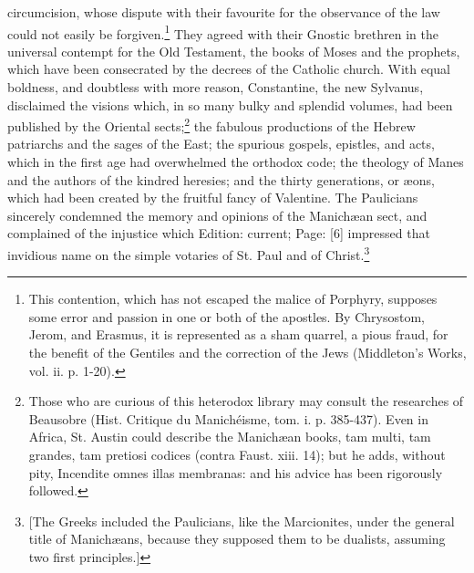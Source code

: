 circumcision, whose dispute with their favourite for the observance of the law could not easily be forgiven.\footnote{This contention, which has not escaped the malice of Porphyry, supposes some error and passion in one or both of the apostles. By Chrysostom, Jerom, and Erasmus, it is represented as a sham quarrel, a pious fraud, for the benefit of the Gentiles and the correction of the Jews (Middleton\texthebrew{}’s Works, vol. ii. p. 1-20).} They agreed with their Gnostic brethren in the universal contempt for the Old Testament, the books of Moses and the prophets, which have been consecrated by the decrees of the Catholic church. With equal boldness, and doubtless with more reason, Constantine, the new Sylvanus, disclaimed the visions which, in so many bulky and splendid volumes, had been published by the Oriental sects;\footnote{Those who are curious of this heterodox library may consult the researches of Beausobre (Hist. Critique du Manichéisme, tom. i. p. 385-437). Even in Africa, St. Austin could describe the Manichæan books, tam multi, tam grandes, tam pretiosi codices (contra Faust. xiii. 14); but he adds, without pity, Incendite omnes illas membranas: and his advice has been rigorously followed.} the fabulous productions of the Hebrew patriarchs and the sages of the East; the spurious gospels, epistles, and acts, which in the first age had overwhelmed the orthodox code; the theology of Manes and the authors of the kindred heresies; and the thirty generations, or æons, which had been created by the fruitful fancy of Valentine. The Paulicians sincerely condemned the memory and opinions of the Manichæan sect, and complained of the injustice which Edition: current; Page: [6] impressed that invidious name on the simple votaries of St. Paul and of Christ.\footnote{[The Greeks included the Paulicians, like the Marcionites, under the general title of Manichæans, because they supposed them to be dualists, assuming two first principles.]}

